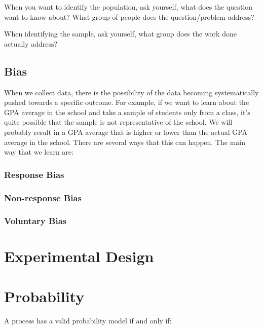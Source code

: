 \documentclass[
]{book}
\begin{document}
When you want to identify the population, ask yourself, what does the
question want to know about? What group of people does the
question/problem address?

When identifying the sample, ask yourself, what group does the work done
actually address?

\hypertarget{bias}{%
\section{Bias}\label{bias}}

When we collect data, there is the possibility of the data becoming
systematically pushed towards a specific outcome. For example, if we
want to learn about the GPA average in the school and take a sample of
students only from a class, it's quite possible that the sample is not
representative of the school. We will probably result in a GPA average
that is higher or lower than the actual GPA average in the school. There
are several ways that this can happen. The main way that we learn are:

\hypertarget{response-bias}{%
\subsection{Response Bias}\label{response-bias}}

\hypertarget{non-response-bias}{%
\subsection{Non-response Bias}\label{non-response-bias}}

\hypertarget{voluntary-bias}{%
\subsection{Voluntary Bias}\label{voluntary-bias}}

\hypertarget{experimental-design}{%
\chapter{Experimental Design}\label{experimental-design}}

\hypertarget{probability}{%
\chapter{Probability}\label{probability}}

A process has a valid probability model if and only if:
\end{document}
